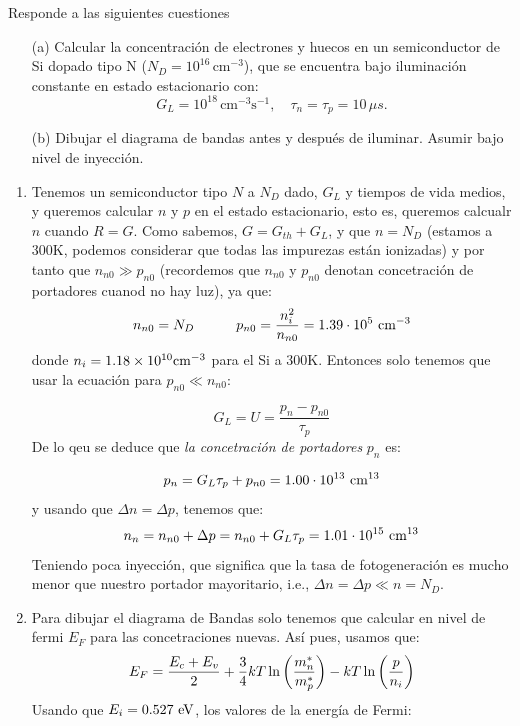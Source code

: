 
\begin{texercise}
	Responde a las siguientes cuestiones
	\begin{itemize}
		\item[(a)] Calcular la concentración de electrones y huecos en un semiconductor de Si dopado tipo N (\(N_D = 10^{16} \, \text{cm}^{-3}\)), que se encuentra bajo iluminación constante en estado estacionario con:
		      \[
			      G_L = 10^{18} \, \text{cm}^{-3}\text{s}^{-1}, \quad \tau_n = \tau_p = 10 \, \mu s.
		      \]
		\item[(b)] Dibujar el diagrama de bandas antes y después de iluminar. Asumir bajo nivel de inyección.
	\end{itemize}

	\tcblower
	\begin{enumerate}[label=\alph*)]
		\item Tenemos un semiconductor tipo $N$ a $N_D$ dado, $G_L$ y tiempos de vida medios, y queremos calcular $n$ y $p$ en el estado estacionario, esto es, queremos calcualr $n$ cuando $R=G$. Como sabemos, $G=G_{th}+G_L$, y que $n=N_D$ (estamos a 300K, podemos considerar que todas las impurezas están ionizadas) y por tanto que $n_{n0}\gg p_{n0}$ (recordemos que $n_{n0}$ y $p_{n0}$ denotan concetración de portadores cuanod no hay luz), ya que:
		\begin{equation}
			n_{n0} = N_D \quad \quad \quad p_{n0} = \frac{n_i^2}{n_{n0}} = 1.39 \cdot 10^5 \ \text{cm}^{-3}
		\end{equation}
		donde $n_i=1.18\times 10^{10} \text{cm}^{-3}$ para el Si a 300K. Entonces solo tenemos que usar la ecuación para $p_{n0}\ll n_{n0}$:

		\begin{equation}
			G_L = U = \frac{p_n-p_{n0}}{\tau_p}
		\end{equation}
		De lo qeu se deduce que \textit{la concetración de portadores} $p_n$ es:

		\begin{equation}
			p_n = G_L \tau_p + p_{n0} = 1.00 \cdot 10^{13} \ \text{cm}^{13}
		\end{equation}
		y usando que $\Delta n = \Delta p$, tenemos que: 
		\begin{equation}
			n_n = n_{n0} + \Delta p  = n_{n0} + G_L\tau_p = 1.01  \cdot 10^{15} \ \text{cm}^{13}
		\end{equation}
		Teniendo poca inyección, que significa que la tasa de fotogeneración es mucho menor que nuestro portador mayoritario, i.e., $\Delta n = \Delta p \ll n = N_D$. 
		\item Para dibujar el diagrama de Bandas solo tenemos que calcular en nivel de fermi $E_F$ para las concetraciones nuevas. Así pues, usamos que:
		\begin{equation}
			E_F = \frac{E_c+E_v}{2} + \frac{3}{4} kT \ln \left( \frac{m_n^*}{m_p^*} \right) - kT \ln \left( \frac{p}{n_i} \right)
		\end{equation}
		Usando que $E_i= 0.527 \ \text{eV}$, los valores de la energía de Fermi:


\end{enumerate}
\end{texercise}
